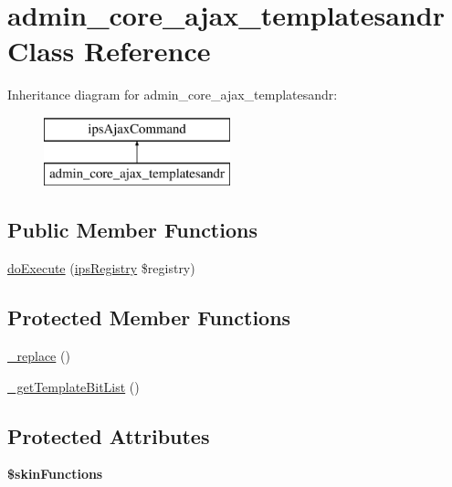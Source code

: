 \hypertarget{classadmin__core__ajax__templatesandr}{\section{admin\-\_\-core\-\_\-ajax\-\_\-templatesandr Class Reference}
\label{classadmin__core__ajax__templatesandr}
}
Inheritance diagram for admin\-\_\-core\-\_\-ajax\-\_\-templatesandr\-:\begin{figure}[H]
\begin{center}
\leavevmode
\includegraphics[height=2.000000cm]{classadmin__core__ajax__templatesandr}
\end{center}
\end{figure}
\subsection*{Public Member Functions}
\begin{DoxyCompactItemize}
\item 
\hyperlink{classadmin__core__ajax__templatesandr_afbc4e912a0604b94d47d66744c64d8ba}{do\-Execute} (\hyperlink{classips_registry}{ips\-Registry} \$registry)
\end{DoxyCompactItemize}
\subsection*{Protected Member Functions}
\begin{DoxyCompactItemize}
\item 
\hyperlink{classadmin__core__ajax__templatesandr_a65ad141ab7a32c50d3c7755413712962}{\-\_\-replace} ()
\item 
\hyperlink{classadmin__core__ajax__templatesandr_a17f5e6f1686896d9fa45a9ee7617d1cf}{\-\_\-get\-Template\-Bit\-List} ()
\end{DoxyCompactItemize}
\subsection*{Protected Attributes}
\begin{DoxyCompactItemize}
\item 
\hypertarget{classadmin__core__ajax__templatesandr_a41d90687021c6f16184b43666509dee8}{{\bfseries \$skin\-Functions}}\label{classadmin__core__ajax__templatesandr_a41d90687021c6f16184b43666509dee8}

\end{DoxyCompactItemize}


